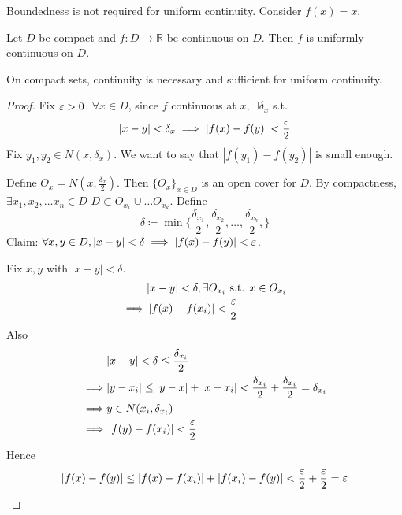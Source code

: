 \begin{remark}
    Boundedness is not required for uniform continuity. Consider $f(x) = x$.
\end{remark}

\begin{theorem}
    Let $D$ be compact and $f: D \to \mathbb{R}$ be continuous on $D$. Then $f$ is uniformly
    continuous on $D$.
\end{theorem}

\begin{remark}
    On compact sets, continuity is necessary and sufficient for uniform continuity.
\end{remark}

\begin{proof}
    Fix $ \varepsilon > 0$. $\forall x \in D$, since $f$ continuous at $x$, $\exists \delta_x$ s.t. 
    \[
        |x-y| < \delta_x \implies \left| f(x) - f(y) \right|  < \frac{\varepsilon}{2}
    \]
    Fix $y_1, y_2 \in N(x, \delta_x)$. We want to say that $|f(y_1) - f(y_2) | $ is small enough.
    \medskip

    Define $O_{x} = N \left( x, \frac{\delta_x}{2} \right) $. Then $ \{ O_x \}_{x \in D} $ is an open cover for $D$. 
    By compactness, $\exists x_1, x_2, \hdots x_n \in D$  $D \subset O_{x_1} \cup \hdots O_{x_k}$.
    Define 
    \[
        \delta \coloneq \min \{ 
            \frac{\delta_{x_1}}{2},
            \frac{\delta_{x_2}}{2},
            \hdots,
            \frac{\delta_{x_k}}{2},
        \} 
    \]
    Claim: $\forall x, y \in D, |x-y| < \delta \implies |f(x) - f(y)| < \varepsilon$. 
    \medskip

    Fix $x, y$ with $|x - y| < \delta$.
    \begin{align*}
        & |x-y| < \delta, \exists O_{x_i} \text{ s.t. } x \in O_{x_i} \\
        \implies & \left| f(x) - f(x_i) \right|  < \frac{\varepsilon}{2} \\
    \end{align*}
    Also
    \begin{align*}
        & |x-y| < \delta \leq \frac{\delta_{x_i}}{2} \\
        \implies & |y - x_i| \leq |y - x| + |x - x_i| < 
        \frac{\delta_{x_i}}{2} + 
        \frac{\delta_{x_i}}{2} 
        = \delta_{x_i} \\
        \implies & y \in N(x_i, \delta_{x_i}) \\
        \implies & \left| f(y) - f(x_i) \right| < \frac{\varepsilon}{2}
    \end{align*}
    Hence
    \begin{align*}
        |f(x) - f(y)| \leq
        \left| f(x) - f(x_i) \right|  + 
        \left| f(x_i) - f(y) \right| 
        <
        \frac{\varepsilon}{2} + \frac{\varepsilon}{2} = \varepsilon
    \end{align*}
\end{proof}

